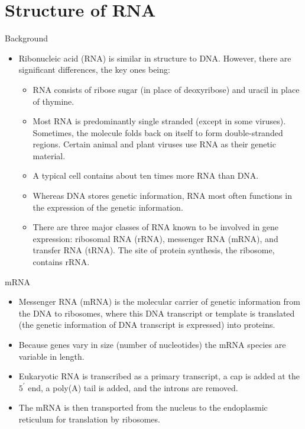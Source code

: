 \documentclass[11pt,ignorenonframetext,aspectratio=169]{beamer}
\providecommand{\tightlist}{%
  \setlength{\itemsep}{0pt}\setlength{\parskip}{0pt}}
\begin{document}
\hypertarget{structure-of-rna}{%
\section{Structure of RNA}\label{structure-of-rna}}

\begin{frame}{Background}
\protect\hypertarget{background}{}

\begin{itemize}
\tightlist
\item
  Ribonucleic acid (RNA) is similar in structure to DNA. However, there
  are significant differences, the key ones being:

  \begin{itemize}
  \tightlist
  \item
    RNA consists of ribose sugar (in place of deoxyribose) and uracil in
    place of thymine.
  \item
    Most RNA is predominantly single stranded (except in some viruses).
    Sometimes, the molecule folds back on itself to form double-stranded
    regions. Certain animal and plant viruses use RNA as their genetic
    material.
  \item
    A typical cell contains about ten times more RNA than DNA.
  \item
    Whereas DNA stores genetic information, RNA most often functions in
    the expression of the genetic information.
  \item
    There are three major classes of RNA known to be involved in gene
    expression: ribosomal RNA (rRNA), messenger RNA (mRNA), and transfer
    RNA (tRNA). The site of protein synthesis, the ribosome, contains
    rRNA.
  \end{itemize}
\end{itemize}

\end{frame}

\begin{frame}{mRNA}
\protect\hypertarget{mrna}{}

\begin{itemize}
\tightlist
\item
  Messenger RNA (mRNA) is the molecular carrier of genetic information
  from the DNA to ribosomes, where this DNA transcript or template is
  translated (the genetic information of DNA transcript is expressed)
  into proteins.
\item
  Because genes vary in size (number of nucleotides) the mRNA species
  are variable in length.
\item
  Eukaryotic RNA is transcribed as a primary transcript, a cap is added
  at the \(5^\prime\) end, a poly(A) tail is added, and the introns are
  removed.
\item
  The mRNA is then transported from the nucleus to the endoplasmic
  reticulum for translation by ribosomes.
\end{itemize}

\end{frame}
\end{document}
